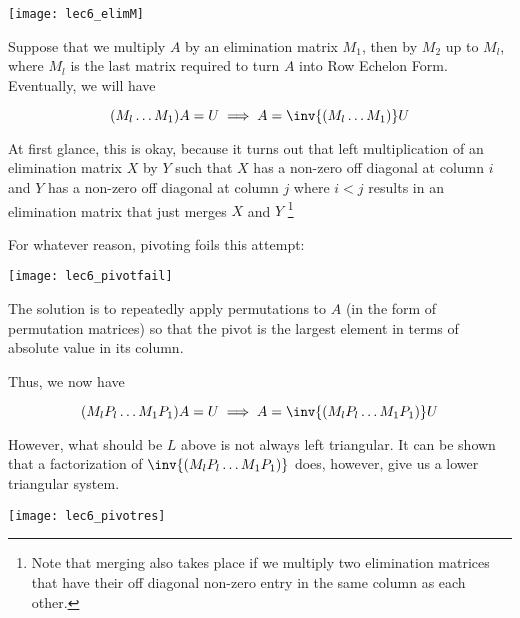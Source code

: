 \documentclass[../main.tex]{subfiles}
\begin{document}
\begin{center}
    \texttt{[image: lec6\_elimM]}
\end{center}


\begin{remark}
    Suppose that we multiply $A$ by an elimination matrix $M_1$, then by $M_2$ up to $M_l$,
    where $M_l$ is the last matrix required to turn $A$ into Row Echelon Form.
    Eventually, we will have 

    \[
        (M_l \dots M_1)A = U \implies A =  \inv{(M_l \dots M_1)}U
    \]

    At first glance, this is okay, because it turns out that left multiplication of an elimination matrix $X$ by $Y$ such that $X$ has a non-zero off diagonal at column $i$ and $Y$ has a non-zero off diagonal at column $j$ where $i < j$ results in an elimination matrix that just merges $X$ and $Y$ \footnote{Note that merging also takes place if we multiply two elimination matrices that have their off diagonal non-zero entry in the same column as each other.}

    For whatever reason, pivoting foils this attempt:

    \begin{center}
        \texttt{[image: lec6\_pivotfail]}
    \end{center}

    The solution is to repeatedly apply permutations to $A$ (in the form
    of permutation matrices) so that the pivot is the largest element
    in terms of absolute value in its column.

    Thus, we now have

    \[
        (M_lP_l \dots M_1P_1)A = U \implies A = \inv{(M_lP_l \dots M_1P_1)}U
    \]

    However, what should be $L$ above is not always left triangular. It can be shown that a factorization of $\inv{(M_lP_l \dots M_1P_1)}$ does, however, give us a lower triangular system.
\begin{center}
    \texttt{[image: lec6\_pivotres]}
\end{center}
\end{remark}
\end{document}
